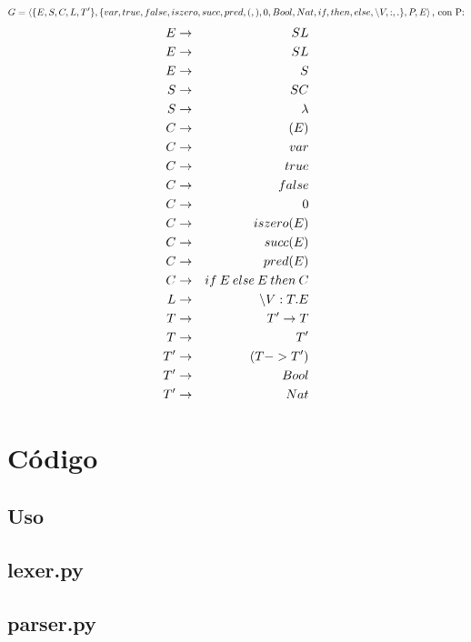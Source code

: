 \documentclass[spanish, a4paper]{article}
\begin{document}
$$G = \left<  \{E,S, C, L, T'\}, \{var, true, false, iszero, succ, pred, (, ), 0, Bool, Nat, if, then, else,  \textnormal{\textbackslash} V, :, . \}, P, E  \right> \textnormal{, con P:} $$
\begin{eqnarray}
 E  & \rightarrow  & S L \nonumber \\
  E  & \rightarrow & S L \nonumber \\
  E  & \rightarrow & S  \nonumber \\
  S  & \rightarrow & S C \nonumber \\
  S  & \rightarrow & \lambda  \nonumber\\
  C  &\rightarrow & (E)  \nonumber\\
  C &  \rightarrow & var  \nonumber\\
  C & \rightarrow & true  \nonumber\\
  C & \rightarrow & false  \nonumber\\
  C & \rightarrow & 0 \nonumber \\
  C & \rightarrow & iszero(E)  \nonumber\\
  C & \rightarrow & succ(E)  \nonumber\\
  C & \rightarrow & pred(E)  \nonumber\\
  C & \rightarrow & if \: E \: else \: E \: then \: C  \nonumber\\
  L & \rightarrow &  \textnormal{\textbackslash} V : T . E  \nonumber\\
  T & \rightarrow & T'  \rightarrow T  \nonumber\\
  T & \rightarrow & T'  \nonumber\\
  T' & \rightarrow & (T -> T')  \nonumber\\
  T' & \rightarrow & Bool  \nonumber\\
  T' &\rightarrow & Nat  \nonumber\\
\end{eqnarray}

\newpage
\section{Código}
\subsection{Uso}

\subsection{lexer.py}
      
\newpage
\subsection{parser.py}
      

%

\end{document}

